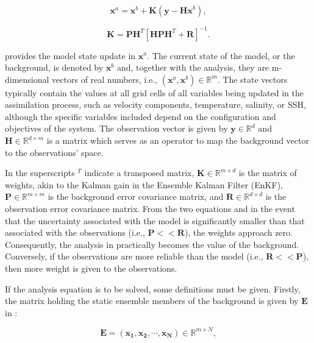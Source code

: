 \begin{equation}\label{eq:cp2_daprob}
	\mathbf{x}^a=\mathbf{x}^b+\mathbf{K} \left( \mathbf{y}-\mathbf{Hx}^b \right),
\end{equation}

\begin{equation}\label{eq:cp2_daK}
	\mathbf{K}=\mathbf{PH}^T \left[ \mathbf{HPH}^T+\mathbf{R} \right]^{-1}.
\end{equation}

 provides the model state update in $\mathbf{x}^a$. The current state of the model, or the background, is denoted by $\mathbf{x}^b$ and, together with the analysis, they are m-dimensional vectors of real numbers, i.e., $\left( \mathbf{x}^a,\mathbf{x}^b \right) \in \mathbb{R}^m$. The state vectors typically contain the values at all grid cells of all variables being updated in the assimilation process, such as velocity components, temperature, salinity, or SSH, although the specific variables included depend on the configuration and objectives of the system. The observation vector is given by $\mathbf{y} \in \mathbb{R}^d$ and $\mathbf{H} \in \mathbb{R}^{d \times m}$ is a matrix which serves as an operator to map the background vector to the observations' space.

In  the superscripts $^T$ indicate a transposed matrix, $\mathbf{K} \in \mathbb{R}^{m \times d}$ is the matrix of weights, akin to the Kalman gain in the Ensemble Kalman Filter (EnKF), $\mathbf{P} \in \mathbb{R}^{m \times m}$ is the background error covariance matrix, and $\mathbf{R} \in \mathbb{R}^{d \times d}$ is the observation error covariance matrix. From the two equations and in the event that the uncertainty associated with the model is significantly smaller than that associated with the observations (i.e., $\mathbf{P}<<\mathbf{R}$), the weights approach zero. Consequently, the analysis in  practically becomes the value of the background. Conversely, if the observations are more reliable than the model (i.e., $\mathbf{R}<<\mathbf{P}$), then more weight is given to the observations.

If the analysis equation is to be solved, some definitions must be given. Firstly, the matrix holding the static ensemble members of the background is given by $\mathbf{E}$ in :

\begin{equation}\label{eq:cp2_ensemble}
	\mathbf{E}=\left( \mathbf{x_1},\mathbf{x_2},\cdots,\mathbf{x_N} \right)\in\mathbb{R}^{m\times N},
\end{equation}

